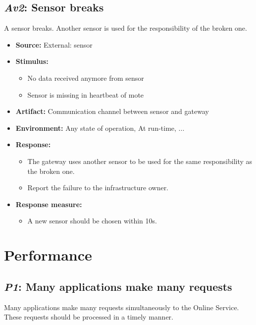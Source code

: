 \documentclass[english]{sareport}
\begin{document}
\subsection{\emph{Av2}: Sensor breaks}
A sensor breaks. Another sensor is used for the responsibility of the broken one.

\begin{itemize}
    \item \textbf{Source:} External: sensor
    \item \textbf{Stimulus:}
        \begin{itemize}
            \item No data received anymore from sensor
            \item Sensor is missing in heartbeat of mote
        \end{itemize}

    \item \textbf{Artifact:} Communication channel between sensor and gateway
    \item \textbf{Environment:} Any state of operation, At run-time, ...
    \item \textbf{Response:}
        \begin{itemize}
            \item The gateway uses another sensor to be used for
                  the same responsibility as the broken one.
            \item Report the failure to the infrastructure owner.
        \end{itemize}

    \item \textbf{Response measure:}
        \begin{itemize}
            \item A new sensor should be chosen within 10s.
        \end{itemize}
\end{itemize}

\section{Performance}
\subsection{\emph{P1}: Many applications make many requests}
Many applications make many requests simultaneously to the Online Service.
These requests should be processed in a timely manner.
\end{document}
